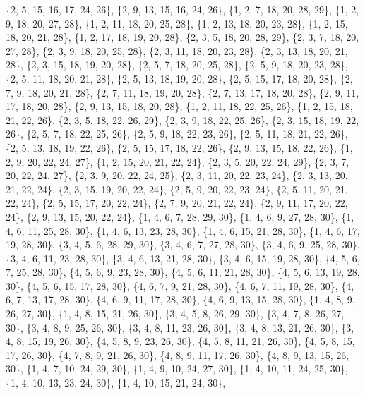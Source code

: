\documentclass[11pt,a4paper]{article}
\begin{document}
{\{2, 5, 15, 16, 17, 24, 26\}, \{2, 9, 13, 15, 16, 24, 26\}, \{1, 2, 7, 18, 20, 28, 29\}, \{1, 2, 9, 18, 20, 27, 28\}, \{1, 2, 11, 18, 20, 25, 28\},
\{1, 2, 13, 18, 20, 23, 28\}, \{1, 2, 15, 18, 20, 21, 28\}, \{1, 2, 17, 18, 19, 20, 28\}, \{2, 3, 5, 18, 20, 28, 29\}, \{2, 3, 7, 18, 20, 27, 28\},
\{2, 3, 9, 18, 20, 25, 28\}, \{2, 3, 11, 18, 20, 23, 28\}, \{2, 3, 13, 18, 20, 21, 28\}, \{2, 3, 15, 18, 19, 20, 28\}, \{2, 5, 7, 18, 20, 25, 28\},
\{2, 5, 9, 18, 20, 23, 28\}, \{2, 5, 11, 18, 20, 21, 28\}, \{2, 5, 13, 18, 19, 20, 28\}, \{2, 5, 15, 17, 18, 20, 28\}, \{2, 7, 9, 18, 20, 21, 28\},
\{2, 7, 11, 18, 19, 20, 28\}, \{2, 7, 13, 17, 18, 20, 28\}, \{2, 9, 11, 17, 18, 20, 28\}, \{2, 9, 13, 15, 18, 20, 28\}, \{1, 2, 11, 18, 22, 25, 26\},
\{1, 2, 15, 18, 21, 22, 26\}, \{2, 3, 5, 18, 22, 26, 29\}, \{2, 3, 9, 18, 22, 25, 26\}, \{2, 3, 15, 18, 19, 22, 26\}, \{2, 5, 7, 18, 22, 25, 26\},
\{2, 5, 9, 18, 22, 23, 26\}, \{2, 5, 11, 18, 21, 22, 26\}, \{2, 5, 13, 18, 19, 22, 26\}, \{2, 5, 15, 17, 18, 22, 26\}, \{2, 9, 13, 15, 18, 22, 26\},
\{1, 2, 9, 20, 22, 24, 27\}, \{1, 2, 15, 20, 21, 22, 24\}, \{2, 3, 5, 20, 22, 24, 29\}, \{2, 3, 7, 20, 22, 24, 27\}, \{2, 3, 9, 20, 22, 24, 25\},
\{2, 3, 11, 20, 22, 23, 24\}, \{2, 3, 13, 20, 21, 22, 24\}, \{2, 3, 15, 19, 20, 22, 24\}, \{2, 5, 9, 20, 22, 23, 24\}, \{2, 5, 11, 20, 21, 22, 24\},
\{2, 5, 15, 17, 20, 22, 24\}, \{2, 7, 9, 20, 21, 22, 24\}, \{2, 9, 11, 17, 20, 22, 24\}, \{2, 9, 13, 15, 20, 22, 24\}, \{1, 4, 6, 7, 28, 29, 30\},
\{1, 4, 6, 9, 27, 28, 30\}, \{1, 4, 6, 11, 25, 28, 30\}, \{1, 4, 6, 13, 23, 28, 30\}, \{1, 4, 6, 15, 21, 28, 30\}, \{1, 4, 6, 17, 19, 28, 30\},
\{3, 4, 5, 6, 28, 29, 30\}, \{3, 4, 6, 7, 27, 28, 30\}, \{3, 4, 6, 9, 25, 28, 30\}, \{3, 4, 6, 11, 23, 28, 30\}, \{3, 4, 6, 13, 21, 28, 30\},
\{3, 4, 6, 15, 19, 28, 30\}, \{4, 5, 6, 7, 25, 28, 30\}, \{4, 5, 6, 9, 23, 28, 30\}, \{4, 5, 6, 11, 21, 28, 30\}, \{4, 5, 6, 13, 19, 28, 30\},
\{4, 5, 6, 15, 17, 28, 30\}, \{4, 6, 7, 9, 21, 28, 30\}, \{4, 6, 7, 11, 19, 28, 30\}, \{4, 6, 7, 13, 17, 28, 30\}, \{4, 6, 9, 11, 17, 28, 30\},
\{4, 6, 9, 13, 15, 28, 30\}, \{1, 4, 8, 9, 26, 27, 30\}, \{1, 4, 8, 15, 21, 26, 30\}, \{3, 4, 5, 8, 26, 29, 30\}, \{3, 4, 7, 8, 26, 27, 30\},
\{3, 4, 8, 9, 25, 26, 30\}, \{3, 4, 8, 11, 23, 26, 30\}, \{3, 4, 8, 13, 21, 26, 30\}, \{3, 4, 8, 15, 19, 26, 30\}, \{4, 5, 8, 9, 23, 26, 30\},
\{4, 5, 8, 11, 21, 26, 30\}, \{4, 5, 8, 15, 17, 26, 30\}, \{4, 7, 8, 9, 21, 26, 30\}, \{4, 8, 9, 11, 17, 26, 30\}, \{4, 8, 9, 13, 15, 26, 30\},
\{1, 4, 7, 10, 24, 29, 30\}, \{1, 4, 9, 10, 24, 27, 30\}, \{1, 4, 10, 11, 24, 25, 30\}, \{1, 4, 10, 13, 23, 24, 30\}, \{1, 4, 10, 15, 21, 24, 30\},
}
\end{document}

